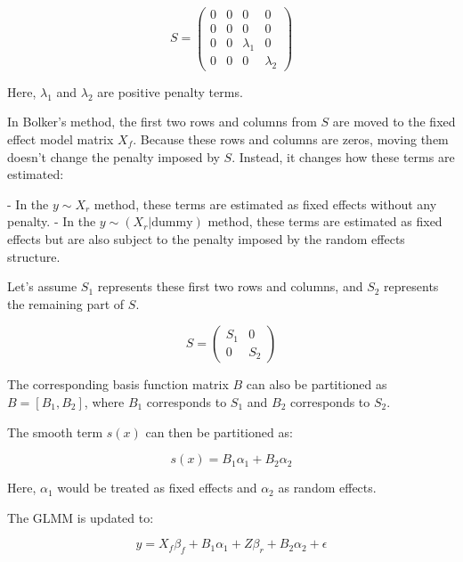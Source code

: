 \begin{equation}
S = \begin{pmatrix}
0 & 0 & 0 & 0 \\
0 & 0 & 0 & 0 \\
0 & 0 & \lambda_1 & 0 \\
0 & 0 & 0 & \lambda_2
\end{pmatrix}
\end{equation}

Here, \( \lambda_1 \) and \( \lambda_2 \) are positive penalty terms.

In Bolker's method, the first two rows and columns from \( S \) are moved to the fixed effect model matrix \( X_f \). Because these rows and columns are zeros, moving them doesn't change the penalty imposed by \( S \). Instead, it changes how these terms are estimated:

- In the \( y \sim X_r \) method, these terms are estimated as fixed effects without any penalty.
- In the \( y \sim (X_r | \text{dummy}) \) method, these terms are estimated as fixed effects but are also subject to the penalty imposed by the random effects structure.
\newline

 Let's assume \(S_1\) represents these first two rows and columns, and \(S_2\) represents the remaining part of \(S\).

\begin{equation}
S = \begin{pmatrix}
S_1 & 0 \\
0 & S_2
\end{pmatrix}
\end{equation}

The corresponding basis function matrix \(B\) can also be partitioned as \(B = [B_1, B_2]\), where \(B_1\) corresponds to \(S_1\) and \(B_2\) corresponds to \(S_2\).

The smooth term \(s(x)\) can then be partitioned as:

\begin{equation}
s(x) = B_1 \alpha_1 + B_2 \alpha_2
\end{equation}

Here, \(\alpha_1\) would be treated as fixed effects and \(\alpha_2\) as random effects.


The GLMM is updated to:

\begin{equation}
y = X_f \beta_f + B_1 \alpha_1 + Z \beta_r + B_2 \alpha_2 + \epsilon
\end{equation}

